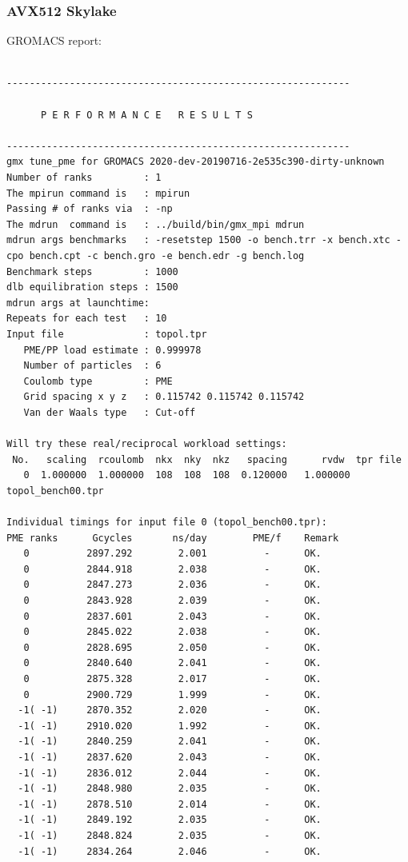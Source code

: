 \subsubsection{AVX512 Skylake}
GROMACS report: \\
\begin{lstlisting}[frame=single]

------------------------------------------------------------

      P E R F O R M A N C E   R E S U L T S

------------------------------------------------------------
gmx tune_pme for GROMACS 2020-dev-20190716-2e535c390-dirty-unknown
Number of ranks         : 1
The mpirun command is   : mpirun
Passing # of ranks via  : -np
The mdrun  command is   : ../build/bin/gmx_mpi mdrun
mdrun args benchmarks   : -resetstep 1500 -o bench.trr -x bench.xtc -cpo bench.cpt -c bench.gro -e bench.edr -g bench.log 
Benchmark steps         : 1000
dlb equilibration steps : 1500
mdrun args at launchtime: 
Repeats for each test   : 10
Input file              : topol.tpr
   PME/PP load estimate : 0.999978
   Number of particles  : 6
   Coulomb type         : PME
   Grid spacing x y z   : 0.115742 0.115742 0.115742
   Van der Waals type   : Cut-off

Will try these real/reciprocal workload settings:
 No.   scaling  rcoulomb  nkx  nky  nkz   spacing      rvdw  tpr file
   0  1.000000  1.000000  108  108  108  0.120000   1.000000  topol_bench00.tpr

Individual timings for input file 0 (topol_bench00.tpr):
PME ranks      Gcycles       ns/day        PME/f    Remark
   0          2897.292        2.001          -      OK.
   0          2844.918        2.038          -      OK.
   0          2847.273        2.036          -      OK.
   0          2843.928        2.039          -      OK.
   0          2837.601        2.043          -      OK.
   0          2845.022        2.038          -      OK.
   0          2828.695        2.050          -      OK.
   0          2840.640        2.041          -      OK.
   0          2875.328        2.017          -      OK.
   0          2900.729        1.999          -      OK.
  -1( -1)     2870.352        2.020          -      OK.
  -1( -1)     2910.020        1.992          -      OK.
  -1( -1)     2840.259        2.041          -      OK.
  -1( -1)     2837.620        2.043          -      OK.
  -1( -1)     2836.012        2.044          -      OK.
  -1( -1)     2848.980        2.035          -      OK.
  -1( -1)     2878.510        2.014          -      OK.
  -1( -1)     2849.192        2.035          -      OK.
  -1( -1)     2848.824        2.035          -      OK.
  -1( -1)     2834.264        2.046          -      OK.


\end{lstlisting}
